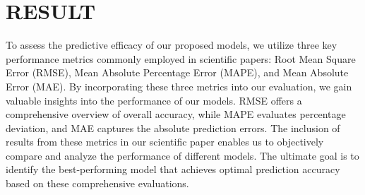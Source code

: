 \documentclass{ieeeojies}
\begin{document}
\section{RESULT}

To assess the predictive efficacy of our proposed models, we utilize three key performance metrics commonly employed in scientific papers: Root Mean Square Error (RMSE), Mean Absolute Percentage Error (MAPE), and Mean Absolute Error (MAE). By incorporating these three metrics into our evaluation, we gain valuable insights into the performance of our models. RMSE offers a comprehensive overview of overall accuracy, while MAPE evaluates percentage deviation, and MAE captures the absolute prediction errors. The inclusion of results from these metrics in our scientific paper enables us to objectively compare and analyze the performance of different models. The ultimate goal is to identify the best-performing model that achieves optimal prediction accuracy based on these comprehensive evaluations.
\end{document}
